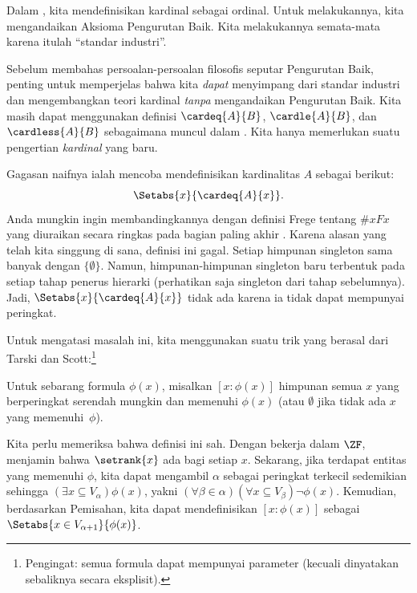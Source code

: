 \documentclass[../../../include/open-logic-section]{subfiles}
\begin{document}

Dalam , kita
mendefinisikan kardinal sebagai ordinal. Untuk melakukannya, kita mengandaikan
Aksioma Pengurutan Baik. Kita melakukannya semata-mata karena itulah
``standar industri''.

Sebelum membahas persoalan-persoalan filosofis seputar Pengurutan Baik,
penting untuk memperjelas bahwa kita \emph{dapat} menyimpang dari standar
industri dan mengembangkan teori kardinal \emph{tanpa} mengandaikan
Pengurutan Baik. Kita masih dapat menggunakan definisi $\cardeq{A}{B}$,
$\cardle{A}{B}$, dan $\cardless{A}{B}$ sebagaimana muncul dalam
. Kita hanya memerlukan suatu pengertian
\emph{kardinal} yang baru.

Gagasan naifnya ialah mencoba mendefinisikan kardinalitas $A$ sebagai
berikut:
\[
	\Setabs{x}{\cardeq{A}{x}}.
\]
Anda mungkin ingin membandingkannya dengan definisi Frege tentang $\# x Fx$
yang diuraikan secara ringkas pada bagian paling akhir
. Karena alasan yang telah kita singgung di sana,
definisi ini gagal. Setiap himpunan singleton sama banyak dengan
$\{\emptyset\}$. Namun, himpunan-himpunan singleton baru terbentuk pada
setiap tahap penerus hierarki (perhatikan saja singleton dari tahap
sebelumnya). Jadi, $\Setabs{x}{\cardeq{A}{x}}$ tidak ada karena ia tidak
dapat mempunyai peringkat.

Untuk mengatasi masalah ini, kita menggunakan suatu trik yang berasal dari
Tarski dan Scott:\footnote{Pengingat: semua formula dapat mempunyai parameter
(kecuali dinyatakan sebaliknya secara eksplisit).}

\begin{defn}
Untuk sebarang formula $\phi(x)$, misalkan $[ x : \phi(x)] $ himpunan semua
$x$ yang berperingkat serendah mungkin dan memenuhi $\phi(x)$ (atau
$\emptyset$ jika tidak ada $x$ yang memenuhi~$\phi$).
\end{defn}

Kita perlu memeriksa bahwa definisi ini sah. Dengan bekerja dalam $\ZF$,
 menjamin bahwa
$\setrank{x}$ ada bagi setiap $x$. Sekarang, jika terdapat entitas yang
memenuhi $\phi$, kita dapat mengambil $\alpha$ sebagai peringkat terkecil
sedemikian sehingga $(\exists x\subseteq V_\alpha)\phi(x)$, yakni
$(\forall \beta \in \alpha)(\forall x \subseteq V_\beta)\lnot \phi(x)$.
Kemudian, berdasarkan Pemisahan, kita dapat mendefinisikan
$[x : \phi(x)]$ sebagai $\Setabs{x \in V_{\alpha+1}}{\phi(x)}$.
\end{document}
